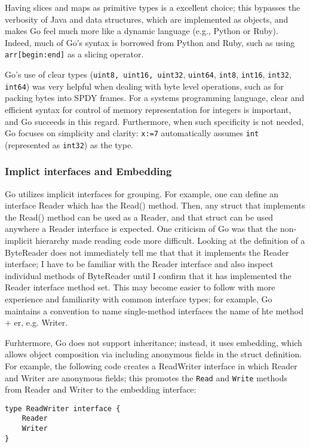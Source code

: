 \documentclass{article}
\begin{document}
Having slices and maps as primitive types is a excellent choice; this bypasses the verbosity of Java and data structures, which are implemented as objects, and makes Go feel much more like a dynamic language (e.g., Python or Ruby). Indeed, much of Go's syntax is borrowed from Python and Ruby, such as using \verb|arr[begin:end]| as a slicing operator.

Go's use of clear types (\verb|uint8, uint16, uint32|, \verb|uint64|, \verb|int8|, \verb|int16|, \verb|int32|, \verb|int64|) was very helpful when dealing with byte level operations, such as for packing bytes into SPDY frames. For a systems programming language, clear and efficient syntax for control of memory representation for integers is important, and Go succeeds in this regard. Furthermore, when such specificity is not needed, Go focuses on simplicity and clarity: \verb|x:=7| automatically assumes \verb|int| (represented as \verb|int32|) as the type.

\subsubsection{Implict interfaces and Embedding}
Go utilizes implicit interfaces for grouping. For example, one can define an interface Reader which has the Read() method. Then, any struct that implements the Read() method can be used as a Reader, and that struct can be used anywhere a Reader interface is expected. 
One criticism of Go was that the non-implicit hierarchy made reading code more difficult. Looking at the definition of a ByteReader does not immediately tell me that that it implements the Reader interface; I have to be familiar with the Reader interface and also inspect individual methods of ByteReader until I confirm that it has implemented the Reader interface method set. This may become easier to follow with more experience and familiarity with common interface types; for example, Go maintains a convention to name  single-method interfaces the name of hte method + er, e.g. Writer.

Furhtermore, Go does not support inheritance; instead, it uses embedding, which allows object composition via including anonymous fields in the struct definition. For example, the following code creates a ReadWriter interface in which Reader and Writer are anonymous fields; this promotes the \verb|Read| and \verb|Write| methods from Reader and Writer to the embedding interface:

\begin{verbatim}
type ReadWriter interface {
    Reader
    Writer
}
\end{verbatim}
\end{document}
